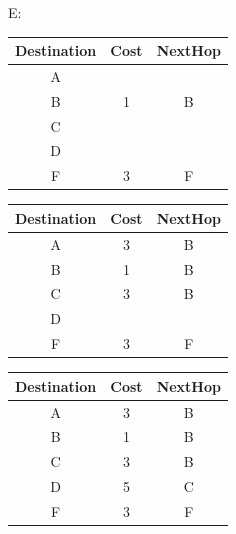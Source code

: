 \documentclass[12pt]{article}
\begin{document}
E:\\
\begin{tabular}{|c|c|c|}
	\hline
	Destination & Cost & NextHop \\\hline
	\hline
	A           &      &         \\\hline
	B           & 1    & B       \\\hline
	C           &      &         \\\hline
	D           &      &         \\\hline
	F           & 3    & F       \\\hline
\end{tabular}
\begin{tabular}{|c|c|c|}
	\hline
	Destination & Cost & NextHop \\\hline
	\hline
	A           & 3    & B       \\\hline
	B           & 1    & B       \\\hline
	C           & 3    & B       \\\hline
	D           &      &         \\\hline
	F           & 3    & F       \\\hline
\end{tabular}
\begin{tabular}{|c|c|c|}
	\hline
	Destination & Cost & NextHop \\\hline
	\hline
	A           & 3    & B       \\\hline
	B           & 1    & B       \\\hline
	C           & 3    & B       \\\hline
	D           & 5    & C       \\\hline
	F           & 3    & F       \\\hline
\end{tabular}
\end{document}
